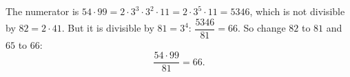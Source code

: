 The numerator is $54\cdot99=2\cdot3^3\cdot3^2\cdot11=2\cdot3^5\cdot11=5346$, which is not divisible by $82=2\cdot41$. But it is divisible by $81=3^4$: $\dfrac{5346}{81}=66$. So change $82$ to $81$ and $65$ to $66$:
\[\boxed{\dfrac{54\cdot99}{81}=66}.\]
